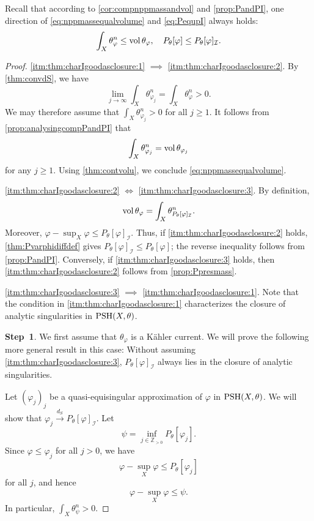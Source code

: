 Recall that according to \cref{cor:compnppmassandvol} and \cref{prop:PandPI}, one direction of \eqref{eq:nppmassequalvolume} and \eqref{eq:PequpI} always holds:
\[
 \int_X \theta_{\varphi}^n\leq \operatorname{vol} \theta_{\varphi},\quad P_{\theta}[\varphi]\leq P_{\theta}[\varphi]_{\mathcal{I}}.
\]
\begin{proof}
    \ref{itm:thm:charIgoodasclosure:1} $\implies$ \ref{itm:thm:charIgoodasclosure:2}. By \cref{thm:convdS}, we have
    \[
    \lim_{j\to\infty} \int_X \theta_{\varphi_j}^n=\int_X \theta_{\varphi}^n>0.
    \]
    We may therefore assume that $\int_X \theta_{\varphi_j}^n>0$ for all $j \geq 1$.
    It follows from \cref{prop:analysingcompPandPI} that
    \[
        \int_X \theta_{\varphi_j}^n=\operatorname{vol} \theta_{\varphi_j}
    \]
    for any $j\geq 1$. Using \cref{thm:contvolu}, we conclude \eqref{eq:nppmassequalvolume}.

    \ref{itm:thm:charIgoodasclosure:2} $\iff$ \ref{itm:thm:charIgoodasclosure:3}. By definition,
    \[
        \operatorname{vol}\theta_{\varphi}= \int_X\theta_{P_{\theta}[\varphi]_{\mathcal I}}^n.
    \]
    Moreover, $\varphi-\sup_X\varphi\leq P_{\theta}[\varphi]_{\mathcal I}$.
    Thus, if \ref{itm:thm:charIgoodasclosure:2} holds, \cref{thm:Pvarphidiffdef} gives $P_{\theta}[\varphi]_{\mathcal I}\leq P_{\theta}[\varphi]$; the reverse inequality follows from \cref{prop:PandPI}. Conversely, if \ref{itm:thm:charIgoodasclosure:3} holds, then \ref{itm:thm:charIgoodasclosure:2} follows from \cref{prop:Ppresmass}.

    \ref{itm:thm:charIgoodasclosure:3} $\implies$ \ref{itm:thm:charIgoodasclosure:1}. Note that the condition in \ref{itm:thm:charIgoodasclosure:1} characterizes the closure of analytic singularities in $\mathrm{PSH}(X,\theta)$.

    \textbf{Step~1}. We first assume that $\theta_{\varphi}$ is a Kähler current. We will prove the following more general result in this case: Without assuming \ref{itm:thm:charIgoodasclosure:3}, $P_{\theta}[\varphi]_{\mathcal{I}}$ always lies in the closure of analytic singularities.

    Let $(\varphi_j)_j$ be a quasi-equisingular approximation of $\varphi$ in $\mathrm{PSH}(X,\theta)$. We will show that $\varphi_j\xrightarrow{d_S}P_{\theta}[\varphi]_{\mathcal{I}}$.
    Let
\[
    \psi=\inf_{j\in \mathbb{Z}_{>0}} P_{\theta}[\varphi_j].
\]
Since $\varphi\leq \varphi_j$ for all $j>0$, we have
\[
    \varphi-\sup_X\varphi\leq P_{\theta}[\varphi_j]
\]
for all $j$, and hence
\[
    \varphi-\sup_X\varphi\leq \psi.
\]
In particular, $\int_X\theta_\psi^n>0$.


\end{proof}

